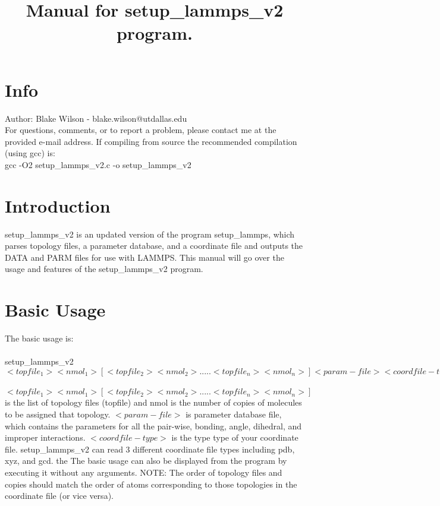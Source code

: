 \documentclass[12pt,letterpaper,]{article}
\begin{document}
\pagestyle{plain}
\title{Manual for setup\_lammps\_v2 program.}
\maketitle
\pagestyle{plain}
\section{Info}
Author: Blake Wilson - blake.wilson@utdallas.edu \\
 For questions, comments, or to report a problem, please contact me at the
provided e-mail address. If compiling from source the recommended compilation (using gcc) is:\\
gcc -O2 setup\_lammps\_v2.c -o setup\_lammps\_v2

\section{Introduction}
setup\_lammps\_v2 is an updated version of the program setup\_lammps, which parses topology files, a parameter database, and a coordinate file and outputs the DATA and PARM files for use with LAMMPS. This manual will go over the usage and features of the setup\_lammps\_v2 program.
\section{Basic Usage}
The basic usage is:\\
\\
setup\_lammps\_v2 $<topfile_1> <nmol_1> [ <topfile_2> <nmol_2> ..... <topfile_n> <nmol_n>] <param-file> <coordfile-type> <coordfile>$\\
\\
 $<topfile_1> <nmol_1> [ <topfile_2> <nmol_2> ..... <topfile_n> <nmol_n>]$ is the list of topology files (topfile) and nmol is the number of copies of molecules to be assigned that topology. $<param-file>$ is parameter database file, which contains the parameters for all the pair-wise, bonding, angle, dihedral, and improper interactions. $<coordfile-type>$ is the type type of your coordinate file. setup\_lammps\_v2 can read 3 different coordinate file types including pdb, xyz, and gcd. the The basic usage can also be displayed from the program by executing it without any arguments. NOTE: The order of topology files and copies should match the order of atoms corresponding to those topologies in the 
coordinate file (or vice versa). 
\end{document}
